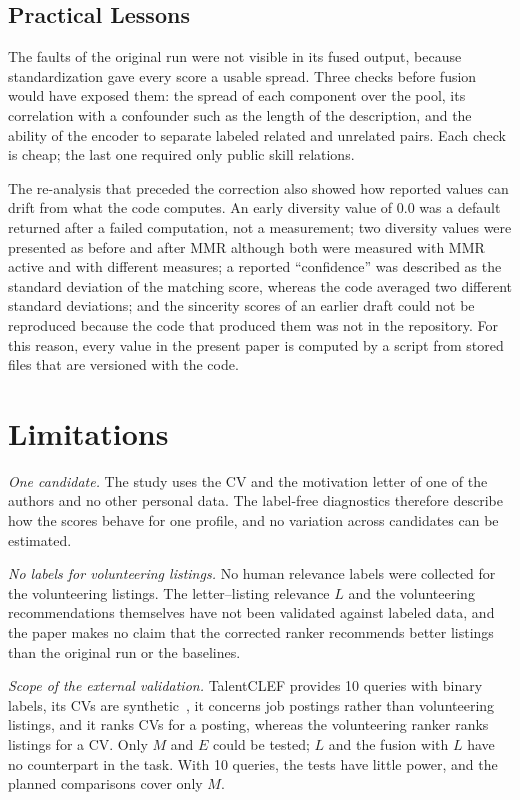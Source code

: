 \documentclass[CHICAGO]{USG}
\begin{document}
\subsection{Practical Lessons}
\label{sec:disc-lessons}
The faults of the original run were not visible in its fused output, because standardization gave every score a usable spread. Three checks before fusion would have exposed them: the spread of each component over the pool, its correlation with a confounder such as the length of the description, and the ability of the encoder to separate labeled related and unrelated pairs. Each check is cheap; the last one required only public skill relations. %

The re-analysis that preceded the correction also showed how reported values can drift from what the code computes. An early diversity value of 0.0 was a default returned after a failed computation, not a measurement; two diversity values were presented as before and after MMR although both were measured with MMR active and with different measures; a reported ``confidence'' was described as the standard deviation of the matching score, whereas the code averaged two different standard deviations; and the sincerity scores of an earlier draft could not be reproduced because the code that produced them was not in the repository. %
For this reason, every value in the present paper is computed by a script from stored files that are versioned with the code.

\section{Limitations}
\label{sec:limitations}

\emph{One candidate.} The study uses the CV and the motivation letter of one of the authors and no other personal data. The label-free diagnostics therefore describe how the scores behave for one profile, and no variation across candidates can be estimated. %

\emph{No labels for volunteering listings.} No human relevance labels were collected for the volunteering listings. The letter--listing relevance $L$ and the volunteering recommendations themselves have not been validated against labeled data, and the paper makes no claim that the corrected ranker recommends better listings than the original run or the baselines. %

\emph{Scope of the external validation.} TalentCLEF provides 10 queries with binary labels, its CVs are synthetic~\citep{gasco2026overview}, it concerns job postings rather than volunteering listings, and it ranks CVs for a posting, whereas the volunteering ranker ranks listings for a CV. Only $M$ and $E$ could be tested; $L$ and the fusion with $L$ have no counterpart in the task. With 10 queries, the tests have little power, and the planned comparisons cover only $M$. %
\end{document}

